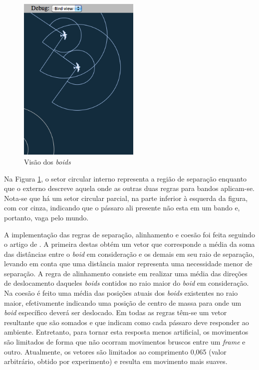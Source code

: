\documentclass[12pt]{article}
\begin{document}
\begin{figure}[ht!]
  \centering
  \includegraphics[height=8cm]{figs/birdview.png}
  \caption{Visão dos \textit{boids} \label{screen2}}
\end{figure}

Na Figura \ref{screen2}, o setor circular interno representa a região de
separação enquanto que o externo descreve aquela onde as outras duas
regras para bandos aplicam-se. Nota-se que há um setor circular parcial,
na parte inferior à esquerda da figura, com cor cinza, indicando que o
pássaro ali presente não esta em um bando e, portanto, vaga pelo mundo.

A implementação das regras de separação, alinhamento e coesão foi
feita seguindo o artigo de \cite{reynolds2}. A primeira destas obtém
um vetor que
corresponde a média da soma das distâncias entre o \textit{boid} em
consideração e os demais em seu raio de separação, levando em conta
que uma distância maior representa uma necessidade menor de
separação. A regra de alinhamento consiste em realizar uma média das
direções de deslocamento daqueles \textit{boids} contidos no raio
maior do \textit{boid} em consideração. Na coesão é feito uma média
das posições atuais dos \textit{boids} existentes no raio maior,
efetivamente indicando uma posição de centro de massa para onde um
\textit{boid} específico deverá ser deslocado. Em todas as regras
têm-se um vetor resultante que são somados e que indicam como cada
pássaro deve responder ao ambiente. Entretanto, para tornar esta
resposta menos artificial, os movimentos são limitados de forma que
não ocorram movimentos bruscos entre um \textit{frame} e outro. Atualmente, os
vetores são limitados ao comprimento 0,065 (valor arbitrário, obtido
por experimento) e resulta em movimento mais suaves.
\end{document}
